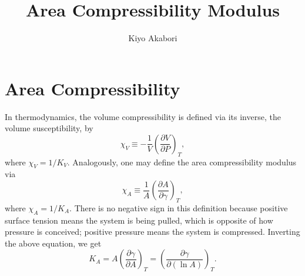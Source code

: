 \documentclass[letterpaper,12pt]{article}
\author{Kiyo Akabori}
\title{Area Compressibility Modulus}
\begin{document}




\section{Area Compressibility}
In thermodynamics, the volume compressibility is defined via its inverse, the volume susceptibility, by
\begin{equation}
  \chi_V \equiv -\frac{1}{V}\left( \frac{\partial V}{\partial P} \right)_T,
\end{equation}
where $\chi_V=1/K_V$. Analogously, one may define the area compressibility modulus via
\begin{equation}
  \chi_A \equiv \frac{1}{A}\left( \frac{\partial A}{\partial\gamma} \right)_T,
\end{equation}
where $\chi_A=1/K_A$. There is no negative sign in this definition because positive surface tension means the system is being pulled, which is opposite of how pressure is conceived; positive pressure means the system is compressed. Inverting the above equation, we get
\begin{equation}
  K_A = A\left(\frac{\partial\gamma}{\partial A}\right)_T = \left(\frac{\partial\gamma}{\partial(\ln A)}\right)_T.
\end{equation}
\end{document}
